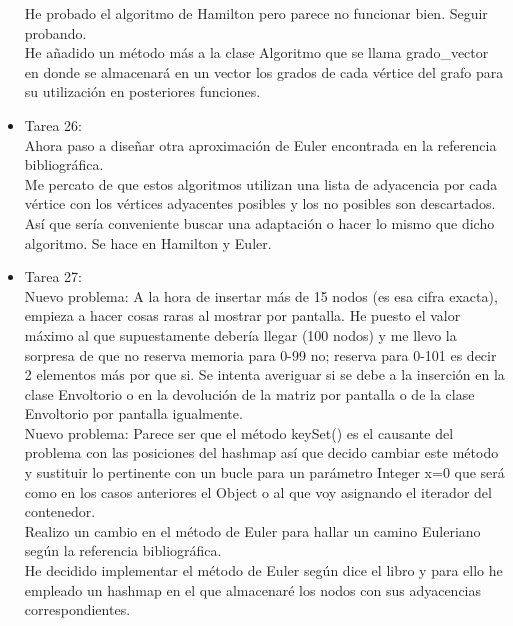 \begin{itemize}
He probado el algoritmo de Hamilton pero parece no funcionar bien. Seguir probando.\\

He añadido un método más a la clase Algoritmo que se llama grado\_vector en donde se almacenará en un vector los grados de cada vértice del grafo para su utilización en posteriores funciones.\\

\item Tarea 26:\\
Ahora paso a diseñar otra aproximación de Euler encontrada en la referencia bibliográfica.\\

Me percato de que estos algoritmos utilizan una lista de adyacencia por cada vértice con los vértices adyacentes posibles y los no posibles son descartados. Así que sería conveniente buscar una adaptación o hacer lo mismo que dicho algoritmo. Se hace en Hamilton y Euler.\\

\item Tarea 27:\\
Nuevo problema: A la hora de insertar más de 15 nodos (es esa cifra exacta), empieza a hacer cosas raras al mostrar por pantalla. He puesto el valor máximo al que supuestamente debería llegar (100 nodos) y me llevo la sorpresa de que no reserva memoria para 0-99 no; reserva para 0-101 es decir 2 elementos más por que si. Se intenta averiguar si se debe a la inserción en la clase Envoltorio o en la devolución de la matriz por pantalla o de la clase Envoltorio por pantalla igualmente.\\

Nuevo problema: Parece ser que el método keySet() es el causante del problema con las posiciones del hashmap así que decido cambiar este método y sustituir lo pertinente con un bucle para un parámetro Integer x=0 que será como en los casos anteriores el Object o al que voy asignando el iterador del contenedor.\\

Realizo un cambio en el método de Euler para hallar un camino Euleriano según la referencia bibliográfica.\\



He decidido implementar el método de Euler según dice el libro y para ello he empleado un hashmap en el que almacenaré los nodos con sus adyacencias correspondientes.\\


\end{itemize}
